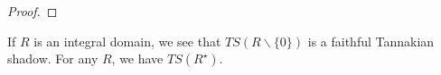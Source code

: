 \begin{proof}
  
  
  
\end{proof}

\begin{example}
  If $R$ is an integral domain, we see that $TS(R \backslash \{0\})$ is a faithful Tannakian shadow. For any $R$, we have $TS(R^{\star})$.
\end{example}
